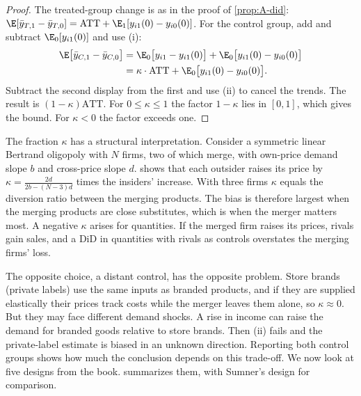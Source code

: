 \begin{proof}
The treated-group change is as in the proof of \cref{prop:A-did}:
$\E[\bar y_{T,1}-\bar y_{T,0}]=\mathrm{ATT}+\E_1[y_{i1}(0)-y_{i0}(0)]$. For the control group, add and subtract
$\E_0[y_{i1}(0)]$ and use (i):
\begin{align*}
\E\big[\bar y_{C,1}-\bar y_{C,0}\big]
&=\E_0\big[y_{i1}-y_{i1}(0)\big]+\E_0\big[y_{i1}(0)-y_{i0}(0)\big]\\
&=\kappa\cdot\mathrm{ATT}+\E_0\big[y_{i1}(0)-y_{i0}(0)\big].
\end{align*}
Subtract the second display from the first and use (ii) to cancel the trends. The result is
$(1-\kappa)\mathrm{ATT}$. For $0\le\kappa\le1$ the factor $1-\kappa$ lies in $[0,1]$, which gives the bound. For
$\kappa<0$ the factor exceeds one.
\end{proof}

The fraction $\kappa$ has a structural interpretation. Consider a symmetric linear Bertrand oligopoly with $N$ firms,
two of which merge, with own-price demand slope $b$ and cross-price slope $d$.  shows that each
outsider raises its price by $\kappa=\frac{2d}{2b-(N-3)d}$ times the insiders' increase. With three firms $\kappa$ equals the diversion ratio between the merging products. The bias is
therefore largest when the merging products are close substitutes, which is when the merger matters most. A
negative $\kappa$ arises for quantities. If the merged firm raises its prices, rivals gain sales, and a DiD in
quantities with rivals as controls overstates the merging firms' loss.

The opposite choice, a distant control, has the opposite problem. Store brands (private labels) use the same
inputs as branded products, and if they are supplied elastically their prices track costs while the merger leaves
them alone, so $\kappa\approx0$. But they may face different demand shocks. A rise in income can raise the demand for
branded goods relative to store brands. Then (ii) fails and the private-label estimate is biased in an unknown
direction. Reporting both control groups shows how much the conclusion depends on this trade-off. We now look at
five designs from the book.  summarizes them, with Sumner's design for comparison.

